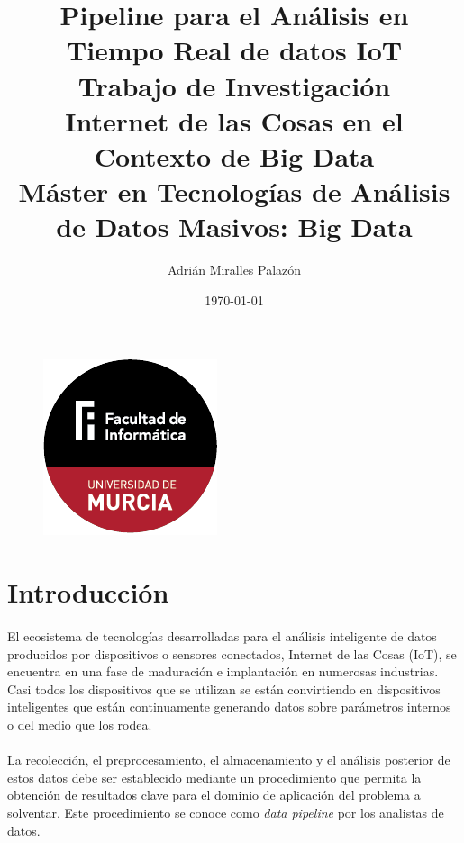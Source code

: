 \documentclass[12pt, a4paper]{article}
\begin{document}
        \title{%
            \huge \textbf{Pipeline para el Análisis en Tiempo Real de datos IoT} \\ \bigskip
            \LARGE Trabajo de Investigación \\ \medskip
            \Large Internet de las Cosas en el Contexto de Big Data\\ \smallskip
            \normalsize Máster en Tecnologías de Análisis de Datos Masivos: Big Data
        }
        \author{Adrián Miralles Palazón}
        \date{\today}
        \maketitle

        \begin{figure}[ht]
            \centerline{\includegraphics[]{logo}}
        \end{figure}

        \clearpage
        \tableofcontents
        
        \clearpage
        \section{Introducción}

        \paragraph{}
        El ecosistema de tecnologías desarrolladas para el análisis inteligente de datos producidos por dispositivos o sensores conectados, Internet de las Cosas (IoT), se encuentra en una fase de maduración e implantación en numerosas industrias. Casi todos los dispositivos que se utilizan se están convirtiendo en dispositivos inteligentes que están continuamente generando datos sobre parámetros internos o del medio que los rodea.

        \paragraph{}
        La recolección, el preprocesamiento, el almacenamiento y el análisis posterior de estos datos debe ser establecido mediante un procedimiento que permita la obtención de resultados clave para el dominio de aplicación del problema a solventar. Este procedimiento se conoce como \textit{data pipeline} por los analistas de datos.
\end{document}
